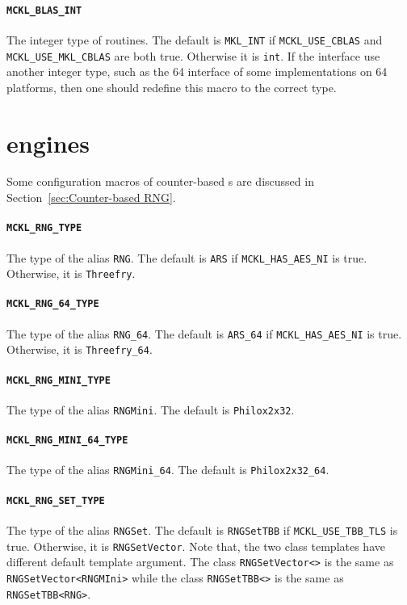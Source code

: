\paragraph{\texttt{MCKL\_BLAS\_INT}} The integer type of \blas routines. The
default is \verb|MKL_INT| if \verb|MCKL_USE_CBLAS| and
\verb|MCKL_USE_MKL_CBLAS| are both true. Otherwise it is \verb|int|. If the
\blas interface use another integer type, such as the \ilp{}64 interface of
some implementations on \lp{}64 platforms, then one should redefine this macro
to the correct type.

\section{\protect\rng engines}
\label{sec:RNG engines}

Some configuration macros of counter-based \rng{}s are discussed in
Section~\ref{sec:Counter-based RNG}.

\paragraph{\texttt{MCKL\_RNG\_TYPE}} The type of the alias \verb|RNG|. The
default is \verb|ARS| if \verb|MCKL_HAS_AES_NI| is true. Otherwise, it is
\verb|Threefry|.

\paragraph{\texttt{MCKL\_RNG\_64\_TYPE}} The type of the alias \verb|RNG_64|.
The default is \verb|ARS_64| if \verb|MCKL_HAS_AES_NI| is true. Otherwise, it
is \verb|Threefry_64|.

\paragraph{\texttt{MCKL\_RNG\_MINI\_TYPE}} The type of the alias
\verb|RNGMini|.  The default is \verb|Philox2x32|.

\paragraph{\texttt{MCKL\_RNG\_MINI\_64\_TYPE}} The type of the alias
\verb|RNGMini_64|. The default is \verb|Philox2x32_64|.

\paragraph{\texttt{MCKL\_RNG\_SET\_TYPE}} The type of the alias \verb|RNGSet|.
The default is \verb|RNGSetTBB| if \verb|MCKL_USE_TBB_TLS| is true. Otherwise,
it is \verb|RNGSetVector|. Note that, the two class templates have different
default template argument. The class \verb|RNGSetVector<>| is the same as
\verb|RNGSetVector<RNGMIni>| while the class \verb|RNGSetTBB<>| is the same as
\verb|RNGSetTBB<RNG>|.

